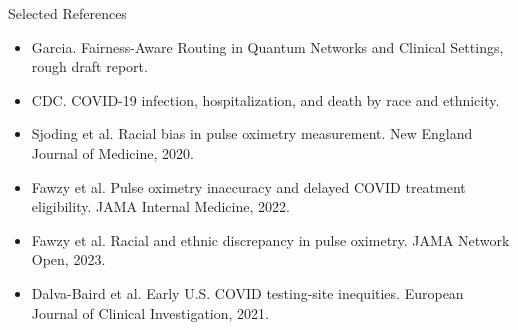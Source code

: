 \begin{frame}{Selected References}
\scriptsize
\begin{itemize}
\item Garcia. Fairness-Aware Routing in Quantum Networks and Clinical Settings, rough draft report.
\item CDC. COVID-19 infection, hospitalization, and death by race and ethnicity.
\item Sjoding et al. Racial bias in pulse oximetry measurement. New England Journal of Medicine, 2020.
\item Fawzy et al. Pulse oximetry inaccuracy and delayed COVID treatment eligibility. JAMA Internal Medicine, 2022.
\item Fawzy et al. Racial and ethnic discrepancy in pulse oximetry. JAMA Network Open, 2023.
\item Dalva-Baird et al. Early U.S. COVID testing-site inequities. European Journal of Clinical Investigation, 2021.
\end{itemize}
\end{frame}
